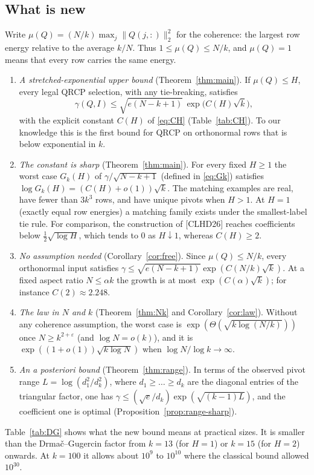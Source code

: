 \documentclass[11pt,a4paper]{article}
\theoremstyle{definition}
\numberwithin{equation}{section}
\begin{document}
\subsection{What is new}
Write $\mu(Q)=(N/k)\max_j\|Q(j,:)\|_2^2$ for the coherence: the largest row energy relative to the average $k/N$.
Thus $1\le\mu(Q)\le N/k$, and $\mu(Q)=1$ means that every row carries the same energy.
\begin{enumerate}
\item \emph{A stretched-exponential upper bound} (Theorem~\ref{thm:main}). If $\mu(Q)\le H$, every legal QRCP
  selection, with any tie-breaking, satisfies
  \[
    \gamma(Q,I)\le\sqrt{e(N-k+1)}\,\exp\bigl(C(H)\sqrt k\bigr),
  \]
  with the explicit constant $C(H)$ of \eqref{eq:CH} (Table~\ref{tab:CH}). To our knowledge this is the first bound for
  QRCP on orthonormal rows that is below exponential in $k$.
\item \emph{The constant is sharp} (Theorem~\ref{thm:main}). For every fixed $H\ge1$ the worst case $G_k(H)$ of
  $\gamma/\sqrt{N-k+1}$ (defined in \eqref{eq:Gk}) satisfies $\log G_k(H)=(C(H)+o(1))\sqrt k$. The matching examples are real, have fewer than $3k^3$ rows, and have unique
  pivots when $H>1$. At $H=1$ (exactly equal row energies) a matching family exists under the smallest-label
  tie rule. For comparison, the construction of [CLHD26] reaches coefficients below $\tfrac12\sqrt{\log H}$, which
  tends to $0$ as $H\downarrow1$, whereas $C(H)\ge2$.
\item \emph{No assumption needed} (Corollary~\ref{cor:free}). Since $\mu(Q)\le N/k$, every orthonormal input
  satisfies $\gamma\le\sqrt{e(N-k+1)}\exp(C(N/k)\sqrt k)$. At a fixed aspect ratio $N\le\alpha k$ the growth is at
  most $\exp(C(\alpha)\sqrt k)$; for instance $C(2)\approx2.248$.
\item \emph{The law in $N$ and $k$} (Theorem~\ref{thm:Nk} and Corollary~\ref{cor:law}). Without any coherence
  assumption, the worst case is $\exp(\Theta(\sqrt{k\log(N/k)}))$ once $N\ge k^{2+\varepsilon}$ (and $\log N=o(k)$),
  and it is $\exp((1+o(1))\sqrt{k\log N})$ when $\log N/\log k\to\infty$.
\item \emph{An a posteriori bound} (Theorem~\ref{thm:range}). In terms of the observed pivot range
  $L=\log(d_1^2/d_k^2)$, where $d_1\ge\dots\ge d_k$ are the diagonal entries of the triangular factor, one has $\gamma\le(\sqrt e/d_k)\exp(\sqrt{(k-1)L})$, and the coefficient one is optimal
  (Proposition~\ref{prop:range-sharp}).
\end{enumerate}
Table~\ref{tab:DG} shows what the new bound means at practical sizes. It is smaller than the Drmač--Gugercin
factor from $k=13$ (for $H=1$) or $k=15$ (for $H=2$) onwards. At $k=100$ it allows about $10^{9}$ to $10^{10}$ where
the classical bound allowed $10^{30}$.
\end{document}

